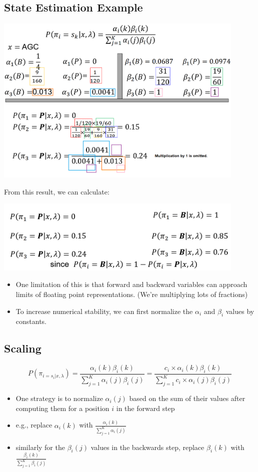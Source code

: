 \documentclass[10pt]{article}
\begin{document}
\subsection*{State Estimation Example}
\begin{center} 
	\includegraphics*[width=0.9\textwidth]{W9_19.png} 
\end{center}
From this result, we can calculate:
\begin{center} 
	\includegraphics*[width=0.9\textwidth]{W9_20.png} 
\end{center}
\begin{itemize}
	\item One limitation of this is that forward and backward variables can approach limits of floating point representations.  (We're multiplying lots of fractions)
	\item To increase numerical stability, we can first normalize the $\alpha_i$ and $\beta_i$ values by constants.
\end{itemize}

\subsection*{Scaling}
\[P(\pi_{i = s_i | x, \lambda}) = \frac{\alpha_i(k) \beta_i(k)}{\sum_{j = 1}^K \alpha_i(j) \beta_i(j)} = \frac{c_i \times \alpha_i(k) \beta_i(k)}{\sum_{j = 1}^K c_i \times \alpha_i (j) \beta_i(j)} \]
\begin{itemize}
	\item One strategy is to normalize $\alpha_i(j)$ based on the sum of their values after computing them for a position $i$ in the forward step
	\item e.g., replace $\alpha_i(k)$ with $\frac{\alpha_i(k)}{\sum_{j = 1}^K \alpha_i(j)}$
	\item similarly for the $\beta_i(j)$ values in the backwards step, replace $\beta_i(k)$ with $\frac{\beta_i(k)}{\sum_{j = 1}^K \beta_i(j)}$
\end{itemize}
\end{document}

